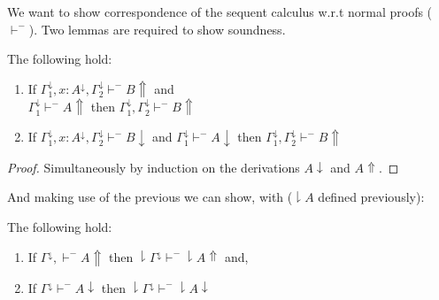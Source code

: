 We want to show correspondence of the sequent calculus  w.r.t normal proofs ($\vdash^{-}$).  Two lemmas are required to show soundness. 
\begin{lemma}
The following hold:
\begin{enumerate}
\item If $\Gamma_1^\downarrow, x:A^\downarrow,\Gamma_2^\downarrow\vdash^{-} B\Uparrow$ and\\$\Gamma_1^\downarrow\vdash^{-} A\Uparrow$ then  $\Gamma_1^\downarrow,\Gamma_2^\downarrow\vdash^{-} B\Uparrow$
\item  If $\Gamma_1^\downarrow, x:A^\downarrow,\Gamma_2^\downarrow\vdash^{-} B\downarrow$ and $\Gamma_1^\downarrow\vdash^{-} A\downarrow$ then $\Gamma_1^\downarrow,\Gamma_2^\downarrow\vdash^{-} B\Uparrow$    
\end{enumerate}
\end{lemma}
\begin{proof}
Simultaneously by induction on the derivations $A\downarrow$ and $A\Uparrow$.
\end{proof}
And making use of the previous we can show, with ($\downharpoonright A$ defined previously):
\begin{lemma}
The following hold:
\begin{enumerate}
		\item If $\Gamma^\downarrow,\vdash^{-}  A\Uparrow$ then $\downharpoonright\Gamma^\downarrow\vdash^{-} \downharpoonright A\Uparrow$   and,
		\item If $\Gamma^\downarrow\vdash^{-} A\downarrow$ then  $\downharpoonright\Gamma^\downarrow\vdash^{-} \downharpoonright A\downarrow$   
	\end{enumerate}
\end{lemma}
